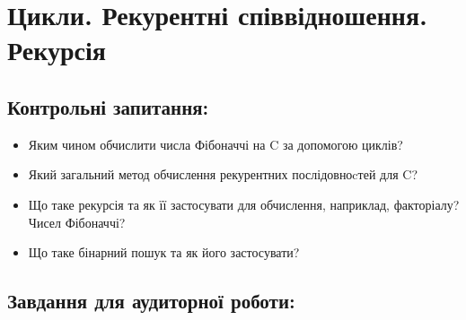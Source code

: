 \documentclass[a5paper,titlepage,openany,twoside,
]
{book_unv}%
\begin{document}
\chapter{Цикли. Рекурентні співвідношення. Рекурсія }
%

\section{Контрольні запитання:}
\begin{itemize}
\item
  Яким чином обчислити числа Фібоначчі на C за допомогою циклів?
\item
  Який загальний метод обчислення рекурентних послідовноcтей для C?
\item
  Що таке рекурсія та як її застосувати для обчислення, наприклад,
  факторіалу? Чисел Фібоначчі?
\item
  Що таке бінарний пошук та як його застосувати?
\end{itemize}

\section{Завдання для аудиторної роботи:}
\end{document}
